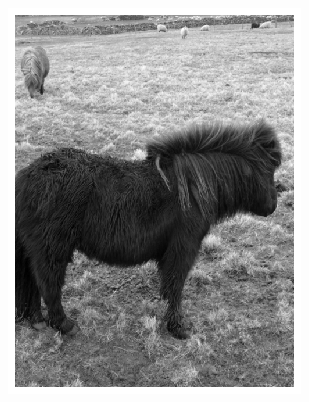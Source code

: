 \documentclass{l4proj}
\begin{document}
\begin{figure}[ht]
  \centering
  \begin{subfigure}[h!]{0.22\textwidth}
    \includegraphics[width=\textwidth]{images/autoencoder/pony_1/gray.png}

\end{subfigure}
\end{figure}
\end{document}
